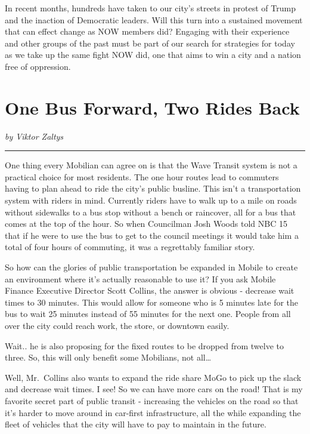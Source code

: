 \documentclass[
]{book}
\begin{document}
In recent months, hundreds have taken to our city's streets in protest of Trump and the inaction of Democratic leaders. Will this turn into a sustained movement that can effect change as NOW members did? Engaging with their experience and other groups of the past must be part of our search for strategies for today as we take up the same fight NOW did, one that aims to win a city and a nation free of oppression.

\section*{One Bus Forward, Two Rides Back}\label{one-bus-forward-two-rides-back}

\emph{by Viktor Zaltys}

\begin{center}\rule{0.5\linewidth}{0.5pt}\end{center}

One thing every Mobilian can agree on is that the Wave Transit system is not a practical choice for most residents. The one hour routes lead to commuters having to plan ahead to ride the city's public busline. This isn't a transportation system with riders in mind. Currently riders have to walk up to a mile on roads without sidewalks to a bus stop without a bench or raincover, all for a bus that comes at the top of the hour. So when Councilman Josh Woods told NBC 15 that if he were to use the bus to get to the council meetings it would take him a total of four hours of commuting, it was a regrettably familiar story.

So how can the glories of public transportation be expanded in Mobile to create an environment where it's actually reasonable to use it? If you ask Mobile Finance Executive Director Scott Collins, the answer is obvious - decrease wait times to 30 minutes. This would allow for someone who is 5 minutes late for the bus to wait 25 minutes instead of 55 minutes for the next one. People from all over the city could reach work, the store, or downtown easily.

Wait.. he is also proposing for the fixed routes to be dropped from twelve to three. So, this will only benefit some Mobilians, not all\ldots{}

Well, Mr.~Collins also wants to expand the ride share MoGo to pick up the slack and decrease wait times. I see! So we can have more cars on the road! That is my favorite secret part of public transit - increasing the vehicles on the road so that it's harder to move around in car-first infrastructure, all the while expanding the fleet of vehicles that the city will have to pay to maintain in the future.
\end{document}
